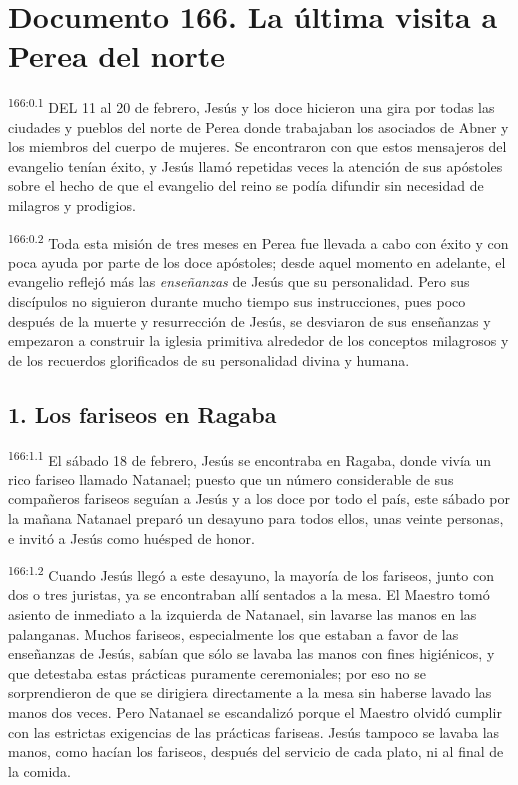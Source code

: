 \chapter{Documento 166. La última visita a Perea del norte}
\par 
\textsuperscript{166:0.1} DEL 11 al 20 de febrero, Jesús y los doce hicieron una gira por todas las ciudades y pueblos del norte de Perea donde trabajaban los asociados de Abner y los miembros del cuerpo de mujeres. Se encontraron con que estos mensajeros del evangelio tenían éxito, y Jesús llamó repetidas veces la atención de sus apóstoles sobre el hecho de que el evangelio del reino se podía difundir sin necesidad de milagros y prodigios.

\par 
\textsuperscript{166:0.2} Toda esta misión de tres meses en Perea fue llevada a cabo con éxito y con poca ayuda por parte de los doce apóstoles; desde aquel momento en adelante, el evangelio reflejó más las \textit{enseñanzas} de Jesús que su personalidad. Pero sus discípulos no siguieron durante mucho tiempo sus instrucciones, pues poco después de la muerte y resurrección de Jesús, se desviaron de sus enseñanzas y empezaron a construir la iglesia primitiva alrededor de los conceptos milagrosos y de los recuerdos glorificados de su personalidad divina y humana.

\section*{1. Los fariseos en Ragaba}
\par 
\textsuperscript{166:1.1} El sábado 18 de febrero, Jesús se encontraba en Ragaba, donde vivía un rico fariseo llamado Natanael; puesto que un número considerable de sus compañeros fariseos seguían a Jesús y a los doce por todo el país, este sábado por la mañana Natanael preparó un desayuno para todos ellos, unas veinte personas, e invitó a Jesús como huésped de honor.

\par 
\textsuperscript{166:1.2} Cuando Jesús llegó a este desayuno, la mayoría de los fariseos, junto con dos o tres juristas, ya se encontraban allí sentados a la mesa. El Maestro tomó asiento de inmediato a la izquierda de Natanael, sin lavarse las manos en las palanganas. Muchos fariseos, especialmente los que estaban a favor de las enseñanzas de Jesús, sabían que sólo se lavaba las manos con fines higiénicos, y que detestaba estas prácticas puramente ceremoniales; por eso no se sorprendieron de que se dirigiera directamente a la mesa sin haberse lavado las manos dos veces. Pero Natanael se escandalizó porque el Maestro olvidó cumplir con las estrictas exigencias de las prácticas fariseas. Jesús tampoco se lavaba las manos, como hacían los fariseos, después del servicio de cada plato, ni al final de la comida.

